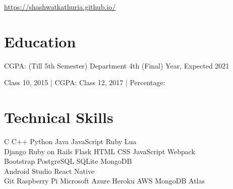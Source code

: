 \documentclass[]{deedy-resume-openfont}
\begin{document}
%
%

%
%


\url{https://shashwatkathuria.github.io/}

%
%

\section{Education}
\begin{large}
    CGPA: (Till 5th Semester)
    \textbullet{}
    Department 
    \textbullet{}
    4th (Final) Year, Expected 2021
\end{large}
\sectionsep

\begin{large}
    Class 10, 2015 | CGPA: 
    \textbullet{}
    Class 12, 2017 | Percentage: 
\end{large}
\sectionsep

%
%

\section{Technical Skills}
\begin{large}
 C \textbullet{}   C++ \textbullet{} Python \textbullet{} Java \textbullet{}
JavaScript \textbullet{} Ruby \textbullet{} Lua \\

 Django \textbullet{} Ruby on Rails \textbullet{} Flask \textbullet{}
 HTML \textbullet{} CSS \textbullet{} JavaScript \textbullet{} Webpack \\ \hspace{36mm} \textbullet{} Bootstrap \textbullet{} PostgreSQL \textbullet{} SQLite \textbullet{} MongoDB \\

 Android Studio \textbullet{} React Native \\

 Git \textbullet{} Raspberry Pi \textbullet{} Microsoft Azure \textbullet{} Heroku \textbullet{} AWS \textbullet{} MongoDB Atlas \\

\end{large}
\sectionsep
\end{document}

